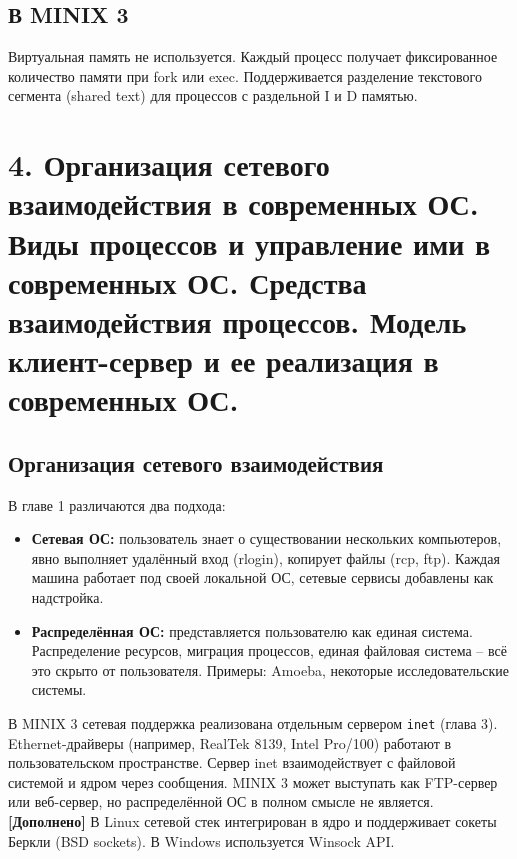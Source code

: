 \documentclass[a4paper,12pt]{article}
\begin{document}
\subsection{В MINIX 3}
Виртуальная память не используется. Каждый процесс получает фиксированное количество памяти при fork или exec. Поддерживается разделение текстового сегмента (shared text) для процессов с раздельной I и D памятью.

\section*{4. Организация сетевого взаимодействия в современных ОС. Виды процессов и управление ими в современных ОС. Средства взаимодействия процессов. Модель клиент-сервер и ее реализация в современных ОС.}

\subsection{Организация сетевого взаимодействия}
В главе 1 различаются два подхода:
\begin{itemize}
    \item \textbf{Сетевая ОС:} пользователь знает о существовании нескольких компьютеров, явно выполняет удалённый вход (rlogin), копирует файлы (rcp, ftp). Каждая машина работает под своей локальной ОС, сетевые сервисы добавлены как надстройка.
    \item \textbf{Распределённая ОС:} представляется пользователю как единая система. Распределение ресурсов, миграция процессов, единая файловая система – всё это скрыто от пользователя. Примеры: Amoeba, некоторые исследовательские системы.
\end{itemize}
В MINIX 3 сетевая поддержка реализована отдельным сервером \texttt{inet} (глава 3). Ethernet-драйверы (например, RealTek 8139, Intel Pro/100) работают в пользовательском пространстве. Сервер inet взаимодействует с файловой системой и ядром через сообщения. MINIX 3 может выступать как FTP-сервер или веб-сервер, но распределённой ОС в полном смысле не является.
\textbf{[Дополнено]} В Linux сетевой стек интегрирован в ядро и поддерживает сокеты Беркли (BSD sockets). В Windows используется Winsock API.
\end{document}

